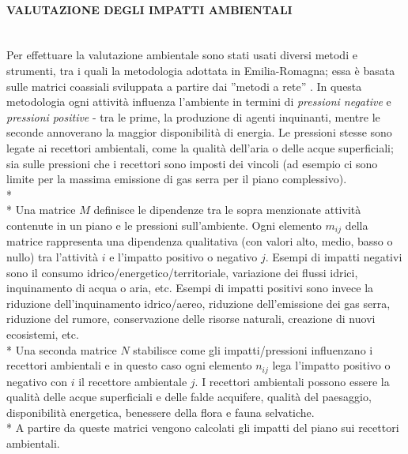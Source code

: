 \documentclass[12pt,a4paper,openright,twoside]{report}
\newcommand{\myparagraph}[1]{\paragraph{#1}\mbox{}\\}
\begin{document}
\myparagraph{VALUTAZIONE DEGLI IMPATTI AMBIENTALI}
Per effettuare la valutazione ambientale sono stati usati diversi metodi e strumenti, tra i quali la metodologia adottata in Emilia-Romagna; essa è basata sulle matrici coassiali \cite{coaxMatr} sviluppata a partire dai ''metodi a rete'' \cite{networkMethod}. In questa metodologia ogni attività influenza l'ambiente  in termini di \emph{pressioni negative} e \emph{pressioni positive} - tra le prime, la produzione di agenti inquinanti, mentre le seconde annoverano la maggior disponibilità di energia. Le pressioni stesse sono legate ai recettori ambientali, come la qualità dell'aria o delle acque superficiali; sia sulle pressioni che i recettori sono imposti dei vincoli (ad esempio ci sono limite per la massima emissione di gas serra per il piano complessivo).\\*\\*
Una matrice $M$ definisce le dipendenze tra le sopra menzionate attività contenute in un piano e le pressioni sull'ambiente. Ogni elemento $m_{ij}$ della matrice rappresenta una dipendenza qualitativa (con valori alto, medio, basso o nullo) tra l'attività $i$ e l'impatto positivo o negativo $j$. Esempi di impatti negativi sono il consumo idrico/energetico/territoriale, variazione dei flussi idrici, inquinamento di acqua o aria, etc. Esempi di impatti positivi sono invece la riduzione dell'inquinamento idrico/aereo, riduzione dell'emissione dei gas serra, riduzione del rumore, conservazione delle risorse naturali, creazione di nuovi ecosistemi, etc.\\*
Una seconda matrice $N$ stabilisce come gli impatti/pressioni influenzano i recettori ambientali e in questo caso ogni elemento $n_{ij}$ lega l'impatto positivo o negativo con $i$ il recettore ambientale $j$. I recettori ambientali possono essere la qualità delle acque superficiali e delle falde acquifere, qualità del paesaggio, disponibilità energetica, benessere della flora e fauna selvatiche.\\*
A partire da queste matrici vengono calcolati gli impatti del piano sui recettori ambientali.
\end{document}

